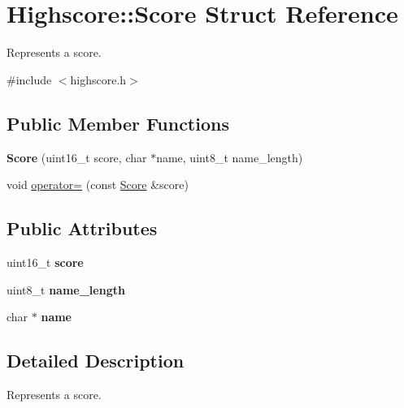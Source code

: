 \hypertarget{struct_highscore_1_1_score}{}\section{Highscore\+:\+:Score Struct Reference}
\label{struct_highscore_1_1_score}


Represents a score.  




{\ttfamily \#include $<$highscore.\+h$>$}

\subsection*{Public Member Functions}
\begin{DoxyCompactItemize}
\item 
\hypertarget{struct_highscore_1_1_score_a12b53d0585857767f7b672a7ca6d6bcd}{}\label{struct_highscore_1_1_score_a12b53d0585857767f7b672a7ca6d6bcd} 
{\bfseries Score} (uint16\+\_\+t score, char $\ast$name, uint8\+\_\+t name\+\_\+length)
\item 
void \hyperlink{struct_highscore_1_1_score_a61c93cb0e15d80f574200d210daa02ab}{operator=} (const \hyperlink{struct_highscore_1_1_score}{Score} \&score)
\end{DoxyCompactItemize}
\subsection*{Public Attributes}
\begin{DoxyCompactItemize}
\item 
\hypertarget{struct_highscore_1_1_score_adb7302dea6fad5c7420f7df730829df6}{}\label{struct_highscore_1_1_score_adb7302dea6fad5c7420f7df730829df6} 
uint16\+\_\+t {\bfseries score}
\item 
\hypertarget{struct_highscore_1_1_score_a078c44b0290200e5f94d80bf2d21fec1}{}\label{struct_highscore_1_1_score_a078c44b0290200e5f94d80bf2d21fec1} 
uint8\+\_\+t {\bfseries name\+\_\+length}
\item 
\hypertarget{struct_highscore_1_1_score_aee466300716e218f0ebb6c695a7e52ca}{}\label{struct_highscore_1_1_score_aee466300716e218f0ebb6c695a7e52ca} 
char $\ast$ {\bfseries name}
\end{DoxyCompactItemize}


\subsection{Detailed Description}
Represents a score. 


